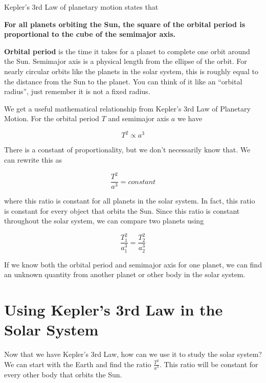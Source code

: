 \documentclass[12pt]{book}
\begin{document}
Kepler's 3rd Law of planetary motion states that

\hspace{10pt}

\textbf{For all planets orbiting the Sun, the square of the orbital period is proportional to the cube of the semimajor axis.}

\linespace

\textbf{Orbital period} is the time it takes for a planet to complete one orbit around the Sun. Semimajor axis is a physical length from the ellipse of the orbit. For nearly circular orbits like the planets in the solar system, this is roughly equal to the distance from the Sun to the planet. You can think of it like an ``orbital radius'', just remember it is not a fixed radius.

We get a useful mathematical relationship from Kepler's 3rd Law of Planetary Motion. For the orbital period $T$ and semimajor axis $a$ we have

\begin{equation}
T^2 \propto a^3
\end{equation}

There is a constant of proportionality, but we don't necessarily know that. We can rewrite this as

\begin{equation}
\frac{T^2}{a^3} = constant
\end{equation}

where this ratio is constant for all planets in the solar system. In fact, this ratio is constant for every object that orbits the Sun. Since this ratio is constant throughout the solar system, we can compare two planets using

\begin{equation}
\frac{T_1^2}{a_1^3} = \frac{T_2^2}{a_2^3}
\end{equation}

If we know both the orbital period and semimajor axis for one planet, we can find an unknown quantity from another planet or other body in the solar system.

\section{Using Kepler's 3rd Law in the Solar System}

Now that we have Kepler's 3rd Law, how can we use it to study the solar system? We can start with the Earth and find the ratio $\frac{T^2}{a^3}$. This ratio will be constant for every other body that orbits the Sun.
\end{document}

